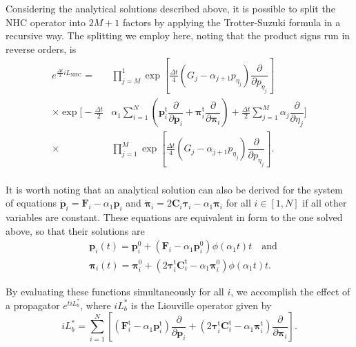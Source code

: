 \documentclass[aip,jcp,reprint,amsmath,amssymb]{revtex4-1}
\newcommand{\mt}[1]{\boldsymbol{\mathbf{#1}}}           %
\newcommand{\vt}[1]{\boldsymbol{\mathbf{#1}}}           %
\newcommand{\tr}[1]{#1^\text{t}}                        %
\newcommand{\diff}[2]{\dfrac{\partial #1}{\partial #2}} %
\begin{document}
Considering the analytical solutions described above, it is possible to split the NHC operator into $2M+1$ factors by applying the Trotter-Suzuki formula in a recursive way. The splitting we employ here, noting that the product signs run in reverse orders, is
\begin{align*}
e^{\frac{\Delta t}{2} i\!L_\text{NHC}} = &\prod_{j=M}^1 \exp \left[ \frac{\Delta t}{4} (G_j - \alpha_{j+1} p_{\eta_j}) \diff{}{p_{\eta_j}} \right] \\
\times \exp \Bigg[ -\frac{\Delta t}{2} &\alpha_1 \sum_{i=1}^N \left(\tr{\vt p}_i \diff{}{\vt p_i} + \tr{\vt \pi}_i \diff{}{\vt \pi_i}\right) + \frac{\Delta t}{2} \sum_{j=1}^M \alpha_j \diff{}{\eta_j} \Bigg] \\
\times &\prod_{j=1}^M \exp \left[\frac{\Delta t}{4} (G_j - \alpha_{j+1} p_{\eta_j}) \diff{}{p_{\eta_j}} \right].\\
\end{align*}

It is worth noting that an analytical solution can also be derived for the system of equations $\dot{\vt p}_i = {\vt F}_i - \alpha_1 \vt p_i$ and $\dot{\vt \pi}_i = 2 \mt C_i \vt \tau_i - \alpha_1 \vt \pi_i$ for all $i \in [1,N]$ if all other variables are constant. These equations are equivalent in form to the one solved above, so that their solutions are
\begin{subequations}
\label{eq:solution_momenta}
\begin{align}
&{\vt p}_i(t) = {\vt p}_i^0 + \left({\vt F}_i - \alpha_1 {\vt p}_i^0 \right) \phi\left(\alpha_1 t \right) t \quad \text{and} \label{eq:solution_p} \\
&{\vt \pi}_i(t) = {\vt \pi}_i^0 + \left(2 \tr{\vt \tau}_i \tr{\mt C}_i - \alpha_1 {\vt \pi}_i^0 \right) \phi\left(\alpha_1 t \right) t. \label{eq:solution_pi}
\end{align}
\end{subequations}

By evaluating these functions simultaneously for all $i$, we accomplish the effect of a propagator $e^{t i\!L_b^\ast}$, where $i\!L_b^\ast$ is the Liouville operator given by
\[
i\!L_b^\ast = \sum_{i=1}^N \left[ \left( \tr{\vt F}_i - \alpha_1 \tr{\vt p}_i \right) \diff{}{\vt p_i} + \left(2 \tr{\vt \tau}_i \tr{\mt C}_i - \alpha_1 \tr{\vt \pi}_i \right) \diff{}{\vt \pi_i} \right].
\]
\end{document}
